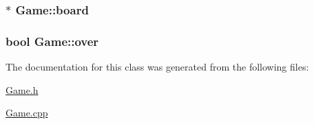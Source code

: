 \subsubsection[{board}]{$\ast$ Game\+::board}\label{classGame_ae38e501e177586af48d2e2300b6be4ba}
\hypertarget{classGame_ae82939826eff0a8847cb822cf95227f4}{}
\subsubsection[{over}]{\setlength{\rightskip}{0pt plus 5cm}bool Game\+::over}\label{classGame_ae82939826eff0a8847cb822cf95227f4}


The documentation for this class was generated from the following files\+:\begin{DoxyCompactItemize}
\item 
\hyperlink{Game_8h}{Game.\+h}\item 
\hyperlink{Game_8cpp}{Game.\+cpp}\end{DoxyCompactItemize}
